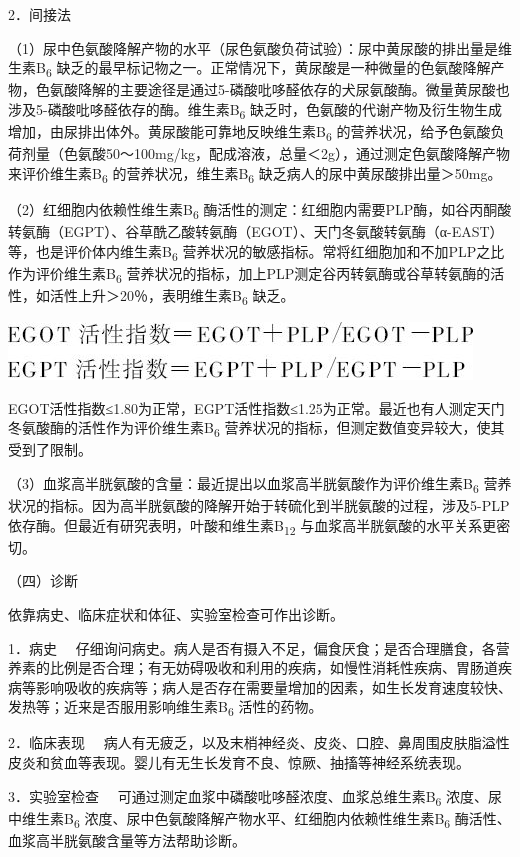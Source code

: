 {2．间接法}

（1）尿中色氨酸降解产物的水平（尿色氨酸负荷试验）：尿中黄尿酸的排出量是维生素B\textsubscript{6}
缺乏的最早标记物之一。正常情况下，黄尿酸是一种微量的色氨酸降解产物，色氨酸降解的主要途径是通过5-磷酸吡哆醛依存的犬尿氨酸酶。微量黄尿酸也涉及5-磷酸吡哆醛依存的酶。维生素B\textsubscript{6}
缺乏时，色氨酸的代谢产物及衍生物生成增加，由尿排出体外。黄尿酸能可靠地反映维生素B\textsubscript{6}
的营养状况，给予色氨酸负荷剂量（色氨酸50～100mg/kg，配成溶液，总量＜2g），通过测定色氨酸降解产物来评价维生素B\textsubscript{6}
的营养状况，维生素B\textsubscript{6} 缺乏病人的尿中黄尿酸排出量＞50mg。

（2）红细胞内依赖性维生素B\textsubscript{6}
酶活性的测定：红细胞内需要PLP酶，如谷丙酮酸转氨酶（EGPT）、谷草酰乙酸转氨酶（EGOT）、天门冬氨酸转氨酶（α-EAST）等，也是评价体内维生素B\textsubscript{6}
营养状况的敏感指标。常将红细胞加和不加PLP之比作为评价维生素B\textsubscript{6}
营养状况的指标，加上PLP测定谷丙转氨酶或谷草转氨酶的活性，如活性上升＞20％，表明维生素B\textsubscript{6}
缺乏。

\includegraphics{./images/Image00012.jpg}

EGOT活性指数≤1.80为正常，EGPT活性指数≤1.25为正常。最近也有人测定天门冬氨酸酶的活性作为评价维生素B\textsubscript{6}
营养状况的指标，但测定数值变异较大，使其受到了限制。

（3）血浆高半胱氨酸的含量：最近提出以血浆高半胱氨酸作为评价维生素B\textsubscript{6}
营养状况的指标。因为高半胱氨酸的降解开始于转硫化到半胱氨酸的过程，涉及5-PLP依存酶。但最近有研究表明，叶酸和维生素B\textsubscript{12}
与血浆高半胱氨酸的水平关系更密切。

（四）诊断

依靠病史、临床症状和体征、实验室检查可作出诊断。

{1．病史}
　仔细询问病史。病人是否有摄入不足，偏食厌食；是否合理膳食，各营养素的比例是否合理；有无妨碍吸收和利用的疾病，如慢性消耗性疾病、胃肠道疾病等影响吸收的疾病等；病人是否存在需要量增加的因素，如生长发育速度较快、发热等；近来是否服用影响维生素B\textsubscript{6}
活性的药物。

{2．临床表现}
　病人有无疲乏，以及末梢神经炎、皮炎、口腔、鼻周围皮肤脂溢性皮炎和贫血等表现。婴儿有无生长发育不良、惊厥、抽搐等神经系统表现。

{3．实验室检查}
　可通过测定血浆中磷酸吡哆醛浓度、血浆总维生素B\textsubscript{6}
浓度、尿中维生素B\textsubscript{6}
浓度、尿中色氨酸降解产物水平、红细胞内依赖性维生素B\textsubscript{6}
酶活性、血浆高半胱氨酸含量等方法帮助诊断。


